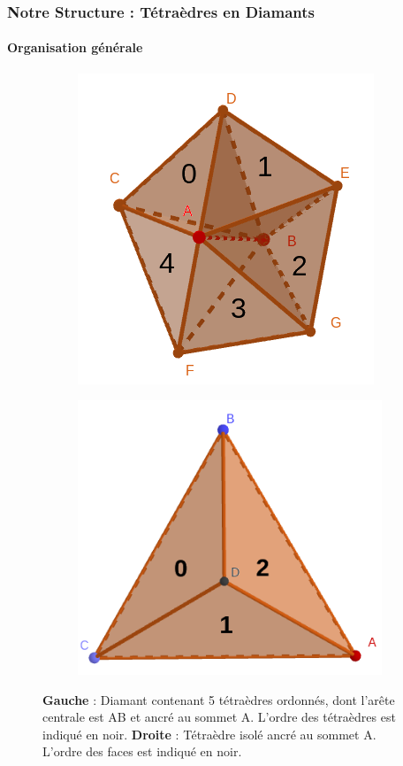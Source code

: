 \documentclass[9pt]{beamer}
\begin{document}
\begin{frame}
\small
\frametitle{Notre Structure : Tétraèdres en Diamants}
\framesubtitle{Organisation générale}

\begin{figure}[H]
\centering
\begin{subfigure}{.5\textwidth}
  \centering
  \includegraphics[scale=0.19]{Images/tetra_ordonnee}
  \caption{}
\end{subfigure}%
\begin{subfigure}{.5\textwidth}
  \centering
  \includegraphics[scale=0.16]{Images/tetra_number_face}
  \caption{}
\end{subfigure}
\caption{\textbf{Gauche} : Diamant contenant 5 tétraèdres ordonnés, dont l'arête centrale est AB et ancré au sommet A. L'ordre des tétraèdres est indiqué en noir. \textbf{Droite} : Tétraèdre isolé ancré au sommet A. L'ordre des faces est indiqué en noir.}

\end{figure}
\end{frame}
\end{document}
